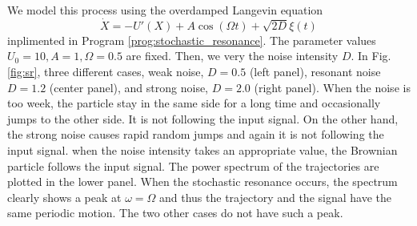 We model this process using the overdamped Langevin equation
\begin{equation}
\dot{X} = -U'(X) + A \cos(\Omega t) + \sqrt{2D} \xi(t)
\end{equation}
inplimented in Program \ref{prog:stochastic_resonance}.
The parameter values $U_0=10, A=1, \Omega=0.5$ are fixed.  Then, we very the noise intensity $D$.  In Fig. \ref{fig:sr}, three different cases, weak noise, $D=0.5$ (left panel), resonant noise $D=1.2$ (center panel), and strong noise, $D=2.0$ (right panel).  When the noise is too week, the particle stay in the same side for a long time and occasionally jumps to the other side.  It is not following the input signal.  
On the other hand, the strong noise causes rapid random jumps and again it is not following the input signal.  when the noise intensity takes an appropriate value, the Brownian particle follows the input signal.  The power spectrum of the trajectories are plotted in the lower panel.
When the stochastic resonance occurs, the spectrum clearly shows a peak at $\omega=\Omega$ and thus the trajectory and the signal have the same periodic motion.  The two other cases do not have such a peak.

